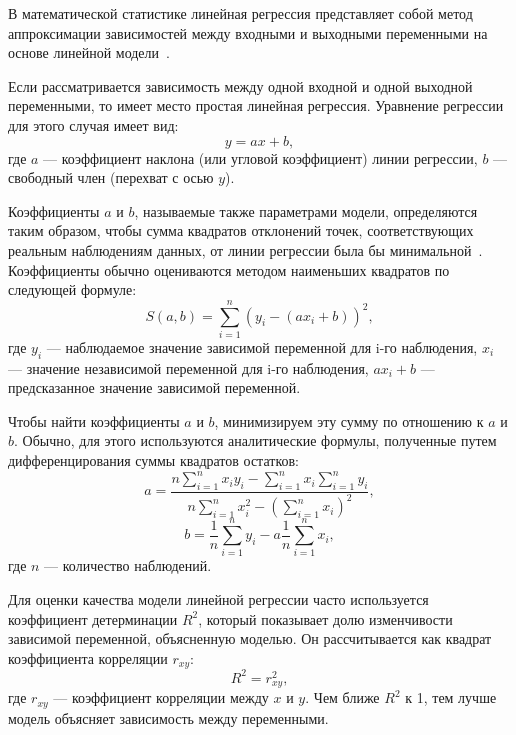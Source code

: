 В математической статистике линейная регрессия представляет собой метод аппроксимации зависимостей между входными и выходными переменными на основе линейной модели~\cite{loginom}.

Если рассматривается зависимость между одной входной и одной выходной переменными, то имеет место простая линейная регрессия.
Уравнение регрессии для этого случая имеет вид:
\begin{equation}
    y = ax + b,
\end{equation}
где $a$ --- коэффициент наклона (или угловой коэффициент) линии регрессии, $b$ --- свободный член (перехват с осью $y$).

Коэффициенты $a$ и $b$, называемые также параметрами модели, определяются таким образом, чтобы сумма квадратов отклонений точек, соответствующих реальным наблюдениям данных, от линии регрессии была бы минимальной~\cite{loginom}.
Коэффициенты обычно оцениваются методом наименьших квадратов по следующей формуле:
\begin{equation}
    S(a, b) = \sum_{i=1}^{n}(y_i - (ax_i + b))^2,
\end{equation}
где $y_i$ --- наблюдаемое значение зависимой переменной для i-го наблюдения, $x_i$ --- значение независимой переменной для i-го наблюдения, $ax_i + b$ --- предсказанное значение зависимой переменной.

Чтобы найти коэффициенты $a$ и $b$, минимизируем эту сумму по отношению к $a$ и $b$.
Обычно, для этого используются аналитические формулы, полученные путем дифференцирования суммы квадратов остатков:
\begin{equation}
    a = \frac{n \sum_{i=1}^{n} x_i y_i - \sum_{i=1}^{n} x_i \sum_{i=1}^{n} y_i}{n \sum_{i=1}^{n} x_i^2 - (\sum_{i=1}^{n} x_i)^2},
\end{equation}
\begin{equation}
    b = \frac{1}{n}\sum_{i=1}^{n} y_i - a\frac{1}{n}\sum_{i=1}^{n} x_i,
\end{equation}
где $n$ --- количество наблюдений.

Для оценки качества модели линейной регрессии часто используется коэффициент детерминации $R^2$, который показывает долю изменчивости зависимой переменной, объясненную моделью.
Он рассчитывается как квадрат коэффициента корреляции $r_{xy}$:
\begin{equation}
    R^2 = r_{xy}^2,
\end{equation}
где $r_{xy}$ --- коэффициент корреляции между $x$ и $y$.
Чем ближе $R^2$ к 1, тем лучше модель объясняет зависимость между переменными.

